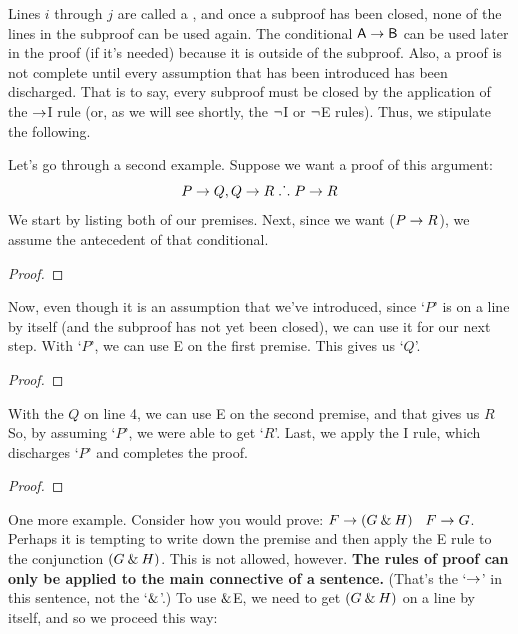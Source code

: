 Lines $i$ through $j$ are called a , and once a subproof has been closed, none of the lines in the subproof can be used again. The conditional $\mathsf{A}\rightarrow\mathsf{B}$ can be used later in the proof (if it's needed) because it is outside of the subproof. Also, a proof is not complete until every assumption that has been introduced has been discharged. That is to say, every subproof must be closed by the application of the $\rightarrow$I rule (or, as we will see shortly, the ${\neg}$I or ${\neg}$E rules).
Thus, we stipulate the following.


Let's go through a second example. Suppose we want a proof of this argument:
	$$P \rightarrow Q, Q \rightarrow R \mathrel{\ldotp\dot{}\,\ldotp} P \rightarrow R$$
We start by listing both of our premises. Next, since we want ($P \rightarrow R$), we assume the antecedent of that conditional. 
\begin{proof}
	 
	 
	\open
		 
	\close
\end{proof}
Now, even though it is an assumption that we've introduced, since `$P$' is on a line by itself (and the subproof has not yet been closed), we can use it for our next step. With `$P$', we can use {\eif}E on the first premise. This gives us `$Q$'. 
\begin{proof}
	 
	 
	\open
	\close
\end{proof}
With the $Q$ on line 4, we can use {\eif}E on the second premise, and that gives us $R$ So, by assuming `$P$', we were able to get `$R$'. Last, we apply the {\eif}I rule, which discharges `$P$' and completes the proof.
\label{HSproof}
\begin{proof}
	 
	 
	\open
	\close
\end{proof}

One more example. Consider how you would prove: $F\rightarrow(G\mathbin{\&} H)$ \therefore\ $F\rightarrow G$. Perhaps it is tempting to write down the premise and then apply the {\eand}E rule to the conjunction $(G \mathbin{\&} H)$. This is not allowed, however. \textbf{The rules of proof can only be applied to the main connective of a sentence.} (That's the `$\rightarrow$' in this sentence, not the `$\mathbin{\&}$'.) To use $\mathbin{\&}$E, we need to get $(G \mathbin{\&} H)$ on a line by itself, and so we proceed this way:


